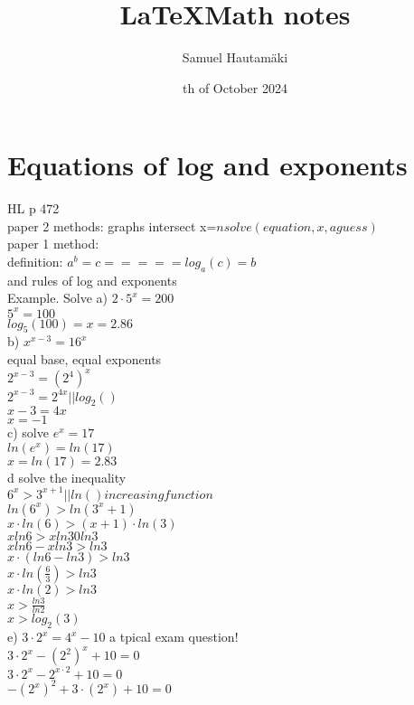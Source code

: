 \documentclass{article}
\title{\LaTeX Math notes}
\author{Samuel Hautamäki}
\date{th of October 2024}
\begin{document}
  \maketitle
   
  \section{Equations of log and exponents}
  HL p 472\\
  paper 2 methods: graphs intersect x=$nsolve(equation,x,a guess)$\\
  paper 1 method:\\
  definition: $a^b=c   ===== log_a(c)=b$\\
  and rules of log and exponents\\
  Example. Solve a) $2\cdot5^x=200$\\
  $5^x=100$\\
  $log_5(100)=x=2.86$\\
  b) $x^{x-3}=16^x$\\
  equal base, equal exponents\\
  $2^{x-3}=(2^4)^x$\\
  $2^{x-3}=2^{4x} || log_2()$\\
  $x-3=4x$\\
  $x=-1$\\
  c) solve $e^x=17$\\
  $ln(e^x)=ln(17)$\\
  $x=ln(17)=2.83$\\
  d solve the inequality\\
  $6^x>3^{x+1} || ln() increasing function$\\
  $ln(6^x)>ln(3^x+1)$\\
  $x\cdot ln(6)>(x+1)\cdot ln(3)$\\
  $x ln 6 > x ln 30 ln3$\\
  $x ln 6 - x ln 3 > ln 3$\\
  $x\cdot(ln 6 - ln 3) > ln3$\\
  $x\cdot ln(\frac{6}{3})>ln 3$\\
  $x\cdot ln(2)>ln 3$\\
  $x>\frac{ln 3}{ln 2}$\\
  $x>log_2(3)$\\
  e) $3\cdot 2^x=4^x-10$ a tpical exam question!\\
  $3\cdot 2^x-(2^2)^x+10=0$\\
  $3\cdot2^x-2^{x\cdot2}+10=0$\\
  $-(2^x)^2+3\cdot(2^x)+10=0$\\ 
\end{document}
